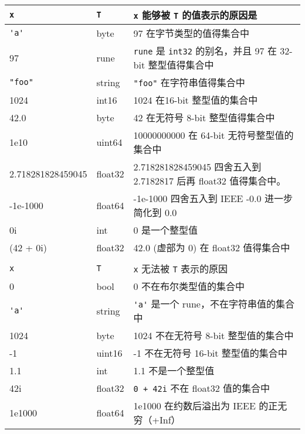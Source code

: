 \begin{tabularx}{\textwidth}{llX}
\lstinline|x|		&\lstinline|T|&\lstinline|x| 能够被 \lstinline|T| 的值表示的原因是 \\
\hline
\lstinline|'a'|		&	byte	&	97 在字节类型的值得集合中 	\\
97          		&	rune	&	\lstinline|rune| 是 \lstinline|int32| 的别名，并且 97 在 32-bit 整型值得集合中 \\
\lstinline|"foo"|   &	string	&	\lstinline|"foo"| 在字符串值得集合中\\
1024            	&	int16	&	1024 在16-bit 整型值的集合中 \\
42.0            	&	byte	&	42 在无符号 8-bit 整型值得集合中 \\
1e10            	&	uint64 	&	10000000000 在 64-bit 无符号整型值的集合中 \\
2.718281828459045 	&	float32	&	2.718281828459045 四舍五入到 2.7182817 后再 float32 值得集合中。  \\
-1e-1000    		&	float64	&   -1e-1000 四舍五入到 IEEE -0.0 进一步简化到 0.0 \\
0i                 	&	int		&    0 是一个整型值	\\
(42 + 0i)          	&	float32	&   42.0 (虚部为 0) 在 float32 值得集合中 \\

\\

\lstinline|x|	&	\lstinline|T|	&	\lstinline|x| 无法被 \lstinline|T| 表示的原因 \\
\hline
0				&	bool			& 	0 不在布尔类型值的集合中	\\
\lstinline|'a'| &	string			&	\lstinline|'a'| 是一个 rune，不在字符串值的集合中	\\
1024			&	byte			& 	1024 不在无符号 8-bit 整型值的集合中	\\
-1				&	uint16			&	-1 不在无符号 16-bit 整型值的集合中	\\
1.1				&	int				&	1.1 不是一个整型值	\\
42i				&	float32			&	\lstinline|0 + 42i| 不在 float32 值的集合中	\\
1e1000			&	float64			&	1e1000	在约数后溢出为 IEEE 的正无穷（+Inf）\\

\end{tabularx}







